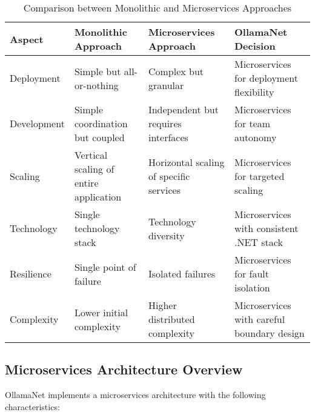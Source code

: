 \begin{table}[h]
  \centering
  \caption{Comparison between Monolithic and Microservices Approaches}
  \label{tab:mono-vs-micro}
  \begin{tabular}{|l|p{3.5cm}|p{3.5cm}|p{3.5cm}|}
    \hline
    \textbf{Aspect} & \textbf{Monolithic Approach} & \textbf{Microservices Approach} & \textbf{OllamaNet Decision} \\
    \hline
    Deployment & Simple but all-or-nothing & Complex but granular & Microservices for deployment flexibility \\
    \hline
    Development & Simple coordination but coupled & Independent but requires interfaces & Microservices for team autonomy \\
    \hline
    Scaling & Vertical scaling of entire application & Horizontal scaling of specific services & Microservices for targeted scaling \\
    \hline
    Technology & Single technology stack & Technology diversity & Microservices with consistent .NET stack \\
    \hline
    Resilience & Single point of failure & Isolated failures & Microservices for fault isolation \\
    \hline
    Complexity & Lower initial complexity & Higher distributed complexity & Microservices with careful boundary design \\
    \hline
  \end{tabular}
\end{table}


\subsection{Microservices Architecture Overview}

OllamaNet implements a microservices architecture with the following characteristics:

